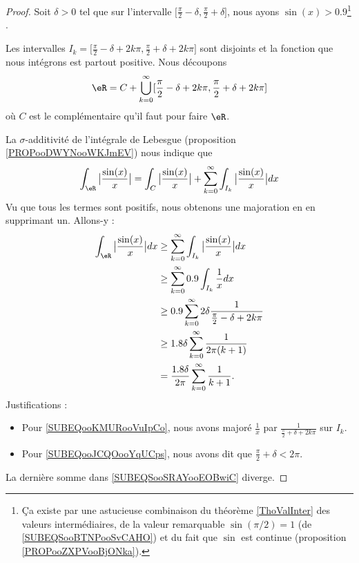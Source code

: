 \begin{proof}
	Soit \( \delta>0\) tel que sur l'intervalle \( \mathopen[ \frac{ \pi }{2}-\delta , \frac{ \pi }{ 2 }+\delta \mathclose]\), nous ayons \( \sin(x)>0.9\)\footnote{Ça existe par une astucieuse combinaison du théorème \ref{ThoValInter} des valeurs intermédiaires, de la valeur remarquable \( \sin(\pi/2)=1\) (de \eqref{SUBEQSooBTNPooSvCAHO}) et du fait que \( \sin\) est continue (proposition \ref{PROPooZXPVooBjONka}).} .

	Les intervalles \( I_k=\mathopen[ \frac{ \pi }{2}-\delta+2k\pi , \frac{ \pi }{2}+\delta+2k\pi \mathclose]\) sont disjoints et la fonction que nous intégrons est partout positive. Nous découpons
	\begin{equation}
		\eR=C+\bigcup_{k=0}^{\infty}\mathopen[ \frac{ \pi }{2}-\delta+2k\pi , \frac{ \pi }{2}+\delta+2k\pi \mathclose]
	\end{equation}
	où \( C\) est le complémentaire qu'il faut pour faire \( \eR\).

	La \( \sigma\)-additivité de l'intégrale de Lebesgue (proposition \ref{PROPooDWYNooWKJmEV}) nous indique que
	\begin{equation}
		\int_{\eR}\big| \frac{ \sin(x) }{ x } \big|= \int_C\big| \frac{ \sin(x) }{ x } \big|+  \sum_{k=0}^{\infty}\int_{I_k}\big| \frac{ \sin(x) }{ x } \big|dx
	\end{equation}
	Vu que tous les termes sont positifs, nous obtenons une majoration en en supprimant un. Allons-y :
	\begin{subequations}        \label{SUBEQSooSRAYooEOBwiC}
		\begin{align}
			\int_{\eR}\big| \frac{ \sin(x) }{ x } \big|dx & \geq \sum_{k=0}^{\infty}\int_{I_k}\big| \frac{ \sin(x) }{ x } \big|dx                                      \\
			                                              & \geq\sum_{k=0}^{\infty}0.9\int_{I_k}\frac{ 1 }{ x }dx                                                      \\
			                                              & \geq 0.9\sum_{k=0}^{\infty}2\delta\frac{1}{ \frac{ \pi }{2}-\delta+2k\pi }     \label{SUBEQooKMURooVuIpCo} \\
			                                              & \geq 1.8\delta\sum_{k=0}^{\infty}\frac{1}{ 2\pi(k+1) }     \label{SUBEQooJCQOooYqUCps}                     \\
			                                              & =\frac{ 1.8\delta }{ 2\pi }\sum_{k=0}^{\infty}\frac{1}{ k+1 }.
		\end{align}
	\end{subequations}
	Justifications :
	\begin{itemize}
		\item Pour \eqref{SUBEQooKMURooVuIpCo}, nous avons majoré \( \frac{1}{ x }\) par \( \frac{1}{ \frac{ \pi }{ 2 }+\delta+2k\pi }\) sur \( I_k\).
		\item Pour \eqref{SUBEQooJCQOooYqUCps}, nous avons dit que \( \frac{ \pi }{2}+\delta<2\pi\).
	\end{itemize}
	La dernière somme dans \eqref{SUBEQSooSRAYooEOBwiC} diverge.


\end{proof}
